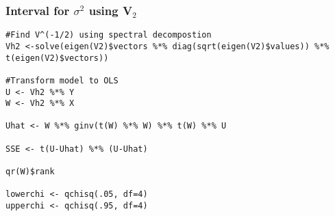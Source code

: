 \documentclass[11pt]{article}
\begin{document}
\subsubsection{Interval for $\sigma$$^2$ using \textbf{V$_2$}}
\label{sec-1-1-3}



\begin{verbatim}
#Find V^(-1/2) using spectral decompostion
Vh2 <-solve(eigen(V2)$vectors %*% diag(sqrt(eigen(V2)$values)) %*% t(eigen(V2)$vectors))

#Transform model to OLS
U <- Vh2 %*% Y
W <- Vh2 %*% X

Uhat <- W %*% ginv(t(W) %*% W) %*% t(W) %*% U

SSE <- t(U-Uhat) %*% (U-Uhat)

qr(W)$rank

lowerchi <- qchisq(.05, df=4)
upperchi <- qchisq(.95, df=4)
\end{verbatim}
\end{document}

